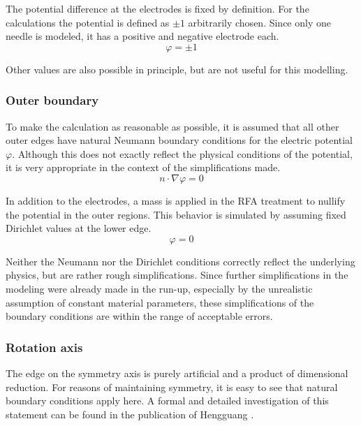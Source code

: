 \documentclass[parskip=half, titlepage=yes, 12pt, BCOR=12mm, DIV=calc]{scrartcl}
\begin{document}
The potential difference at the electrodes is fixed by definition. For the calculations the potential is defined as $\pm 1$ arbitrarily chosen. Since only one needle is modeled, it has a positive and negative electrode each.
\begin{equation}
    \varphi = \pm 1
\end{equation}

Other values are also possible in principle, but are not useful for this modelling.

\subsubsection{Outer boundary}

To make the calculation as reasonable as possible, it is assumed that all other outer edges have natural Neumann boundary conditions for the electric potential $\varphi$. Although this does not exactly reflect the physical conditions of the potential, it is very appropriate in the context of the simplifications made.
\begin{equation}
    n \cdot \nabla \varphi = 0
\end{equation}

In addition to the electrodes, a mass is applied in the RFA treatment to nullify the potential in the outer regions. This behavior is simulated by assuming fixed Dirichlet values at the lower edge.
\begin{equation}
    \varphi = 0
\end{equation}

Neither the Neumann nor the Dirichlet conditions correctly reflect the underlying physics, but are rather rough simplifications.
Since further simplifications in the modeling were already made in the run-up, especially by the unrealistic assumption of constant material parameters, these simplifications of the boundary conditions are within the range of acceptable errors.


\subsubsection{Rotation axis}

The edge on the symmetry axis is purely artificial and a product of dimensional reduction. For reasons of maintaining symmetry, it is easy to see that natural boundary conditions apply here.
A formal and detailed investigation of this statement can be found in the publication of Hengguang \cite{hengguang}. 
\end{document}
